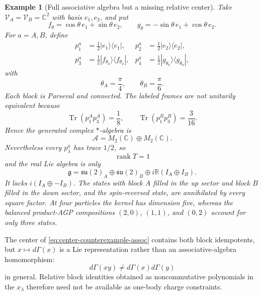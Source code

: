 \documentclass[11pt]{article}
\numberwithin{equation}{section}
\newtheorem{example}[theorem]{Example}
\newcommand{\Tr}{\operatorname{Tr}}
\newcommand{\cA}{\mathcal A}
\newcommand{\cV}{\mathcal V}
\newcommand{\fg}{\mathfrak g}
\newcommand{\rank}{\operatorname{rank}}
\begin{document}
\begin{example}[Full associative algebra but a missing relative center]
\label{ex:center-counterexample}
Take $\cV_A=\cV_B=\mathbb C^2$ with basis $e_1,e_2$, and put
\begin{equation}
 f_\theta=\cos\theta\,e_1+\sin\theta\,e_2,
 \qquad
 g_\theta=-\sin\theta\,e_1+\cos\theta\,e_2.
 \label{eq:rotated-basis}
\end{equation}
For $a=A,B$, define
\begin{align}
 p_1^a&=\frac12|e_1\rangle\langle e_1|,
 &
 p_2^a&=\frac12|e_2\rangle\langle e_2|,
 \nonumber\\
 p_3^a&=\frac12|f_{\theta_a}\rangle\langle f_{\theta_a}|,
 &
 p_4^a&=\frac12|g_{\theta_a}\rangle\langle g_{\theta_a}|,
 \label{eq:center-counterexample-frames}
\end{align}
with
\begin{equation}
 \theta_A=\frac\pi4,
 \qquad
 \theta_B=\frac\pi6.
 \label{eq:center-counterexample-angles}
\end{equation}
Each block is Parseval and connected.  The labeled frames are not unitarily equivalent because
\begin{equation}
 \Tr(p_1^Ap_3^A)=\frac18,
 \qquad
 \Tr(p_1^Bp_3^B)=\frac{3}{16}.
 \label{eq:center-counterexample-mismatch}
\end{equation}
Hence the generated complex $*$-algebra is
\begin{equation}
 \cA=M_2(\mathbb C)\oplus M_2(\mathbb C).
 \label{eq:center-counterexample-assoc}
\end{equation}
Nevertheless every $p_\lambda^a$ has trace $1/2$, so
\begin{equation}
 \rank T=1
 \label{eq:center-counterexample-rank}
\end{equation}
and the real Lie algebra is only
\begin{equation}
 \fg
 =
 \mathfrak{su}(2)_A
 \oplus
 \mathfrak{su}(2)_B
 \oplus
 i\mathbb R(I_A\oplus I_B).
 \label{eq:center-counterexample-lie}
\end{equation}
It lacks $i(I_A\oplus-I_B)$.  The states with block $A$ filled in the up sector and block $B$ filled in the down sector, and the spin-reversed state, are annihilated by every square factor.  At four particles the kernel has dimension five, whereas the balanced product-AGP compositions $(2,0)$, $(1,1)$, and $(0,2)$ account for only three states.
\end{example}

The center of \eqref{eq:center-counterexample-assoc} contains both block idempotents, but $x\mapsto d\Gamma(x)$ is a Lie representation rather than an associative-algebra homomorphism:
\begin{equation}
 d\Gamma(xy)\ne d\Gamma(x)d\Gamma(y)
 \label{eq:dGamma-not-assoc}
\end{equation}
in general.  Relative block identities obtained as noncommutative polynomials in the $x_\lambda$ therefore need not be available as one-body charge constraints.
\end{document}
